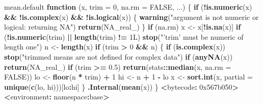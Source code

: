 \documentclass[10pt,a4paper]{book}
\newenvironment{Shaded}{\begin{snugshade}}{\end{snugshade}}
\newcommand{\KeywordTok}[1]{\textcolor[rgb]{0.13,0.29,0.53}{\textbf{#1}}}
\newcommand{\DataTypeTok}[1]{\textcolor[rgb]{0.13,0.29,0.53}{#1}}
\newcommand{\DecValTok}[1]{\textcolor[rgb]{0.00,0.00,0.81}{#1}}
\newcommand{\FloatTok}[1]{\textcolor[rgb]{0.00,0.00,0.81}{#1}}
\newcommand{\StringTok}[1]{\textcolor[rgb]{0.31,0.60,0.02}{#1}}
\newcommand{\OtherTok}[1]{\textcolor[rgb]{0.56,0.35,0.01}{#1}}
\newcommand{\ControlFlowTok}[1]{\textcolor[rgb]{0.13,0.29,0.53}{\textbf{#1}}}
\newcommand{\OperatorTok}[1]{\textcolor[rgb]{0.81,0.36,0.00}{\textbf{#1}}}
\newcommand{\ErrorTok}[1]{\textcolor[rgb]{0.64,0.00,0.00}{\textbf{#1}}}
\newcommand{\NormalTok}[1]{#1}
\begin{document}
\begin{Shaded}
\begin{Highlighting}[]
\NormalTok{mean.default}
\ControlFlowTok{function}\NormalTok{ (x, }\DataTypeTok{trim =} \DecValTok{0}\NormalTok{, }\DataTypeTok{na.rm =} \OtherTok{FALSE}\NormalTok{, ...) }
\NormalTok{\{}
    \ControlFlowTok{if}\NormalTok{ (}\OperatorTok{!}\KeywordTok{is.numeric}\NormalTok{(x) }\OperatorTok{&&}\StringTok{ }\OperatorTok{!}\KeywordTok{is.complex}\NormalTok{(x) }\OperatorTok{&&}\StringTok{ }\OperatorTok{!}\KeywordTok{is.logical}\NormalTok{(x)) \{}
        \KeywordTok{warning}\NormalTok{(}\StringTok{"argument is not numeric or logical: returning NA"}\NormalTok{)}
        \KeywordTok{return}\NormalTok{(}\OtherTok{NA_real_}\NormalTok{)}
\NormalTok{    \}}
    \ControlFlowTok{if}\NormalTok{ (na.rm) }
\NormalTok{        x <-}\StringTok{ }\NormalTok{x[}\OperatorTok{!}\KeywordTok{is.na}\NormalTok{(x)]}
    \ControlFlowTok{if}\NormalTok{ (}\OperatorTok{!}\KeywordTok{is.numeric}\NormalTok{(trim) }\OperatorTok{||}\StringTok{ }\KeywordTok{length}\NormalTok{(trim) }\OperatorTok{!=}\StringTok{ }\NormalTok{1L) }
        \KeywordTok{stop}\NormalTok{(}\StringTok{"'trim' must be numeric of length one"}\NormalTok{)}
\NormalTok{    n <-}\StringTok{ }\KeywordTok{length}\NormalTok{(x)}
    \ControlFlowTok{if}\NormalTok{ (trim }\OperatorTok{>}\StringTok{ }\DecValTok{0} \OperatorTok{&&}\StringTok{ }\NormalTok{n) \{}
        \ControlFlowTok{if}\NormalTok{ (}\KeywordTok{is.complex}\NormalTok{(x)) }
            \KeywordTok{stop}\NormalTok{(}\StringTok{"trimmed means are not defined for complex data"}\NormalTok{)}
        \ControlFlowTok{if}\NormalTok{ (}\KeywordTok{anyNA}\NormalTok{(x)) }
            \KeywordTok{return}\NormalTok{(}\OtherTok{NA_real_}\NormalTok{)}
        \ControlFlowTok{if}\NormalTok{ (trim }\OperatorTok{>=}\StringTok{ }\FloatTok{0.5}\NormalTok{) }
            \KeywordTok{return}\NormalTok{(stats}\OperatorTok{::}\KeywordTok{median}\NormalTok{(x, }\DataTypeTok{na.rm =} \OtherTok{FALSE}\NormalTok{))}
\NormalTok{        lo <-}\StringTok{ }\KeywordTok{floor}\NormalTok{(n }\OperatorTok{*}\StringTok{ }\NormalTok{trim) }\OperatorTok{+}\StringTok{ }\DecValTok{1}
\NormalTok{        hi <-}\StringTok{ }\NormalTok{n }\OperatorTok{+}\StringTok{ }\DecValTok{1} \OperatorTok{-}\StringTok{ }\NormalTok{lo}
\NormalTok{        x <-}\StringTok{ }\KeywordTok{sort.int}\NormalTok{(x, }\DataTypeTok{partial =} \KeywordTok{unique}\NormalTok{(}\KeywordTok{c}\NormalTok{(lo, hi)))[lo}\OperatorTok{:}\NormalTok{hi]}
\NormalTok{    \}}
    \KeywordTok{.Internal}\NormalTok{(}\KeywordTok{mean}\NormalTok{(x))}
\NormalTok{\}}
\OperatorTok{<}\NormalTok{bytecode}\OperatorTok{:}\StringTok{ }\DecValTok{0x567b050}\OperatorTok{>}
\ErrorTok{<}\NormalTok{environment}\OperatorTok{:}\StringTok{ }\NormalTok{namespace}\OperatorTok{:}\NormalTok{base}\OperatorTok{>}
\end{Highlighting}
\end{Shaded}
\end{document}
